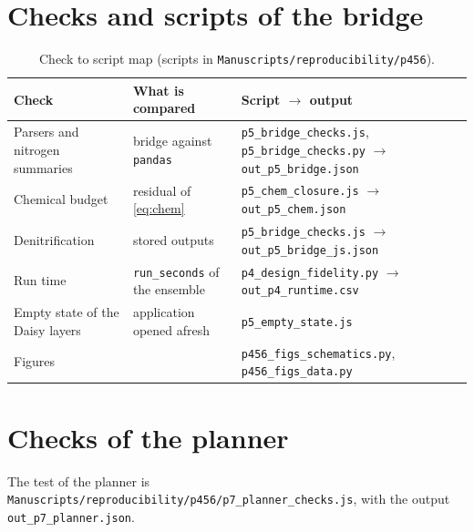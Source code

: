 \documentclass[preprint,12pt]{elsarticle}
\begin{document}
\section{Checks and scripts of the bridge}\label{app:repro5}
\begin{table}[H]\centering\small
\caption{Check to script map (scripts in \texttt{Manuscripts/reproducibility/p456}).}
\begin{tabularx}{\textwidth}{>{\raggedright\arraybackslash}p{4.6cm}>{\raggedright\arraybackslash}p{4.0cm}X}
\toprule Check & What is compared & Script $\to$ output\\\midrule
Parsers and nitrogen summaries & bridge against \texttt{pandas} & \texttt{p5\_bridge\_checks.js}, \texttt{p5\_bridge\_checks.py} $\to$ \texttt{out\_p5\_bridge.json}\\
Chemical budget & residual of \cref{eq:chem} & \texttt{p5\_chem\_closure.js} $\to$ \texttt{out\_p5\_chem.json}\\
Denitrification & 792 stored outputs & \texttt{p5\_bridge\_checks.js} $\to$ \texttt{out\_p5\_bridge\_js.json}\\
Run time & \texttt{run\_seconds} of the ensemble & \texttt{p4\_design\_fidelity.py} $\to$ \texttt{out\_p4\_runtime.csv}\\
Empty state of the Daisy layers & application opened afresh & \texttt{p5\_empty\_state.js}\\
Figures & & \texttt{p456\_figs\_schematics.py}, \texttt{p456\_figs\_data.py}\\\bottomrule
\end{tabularx}
\end{table}

\section{Checks of the planner}\label{app:repro7}
The test of the planner is \texttt{Manuscripts/reproducibility/p456/p7\_planner\_checks.js}, with the output \texttt{out\_p7\_planner.json}.
\end{document}
